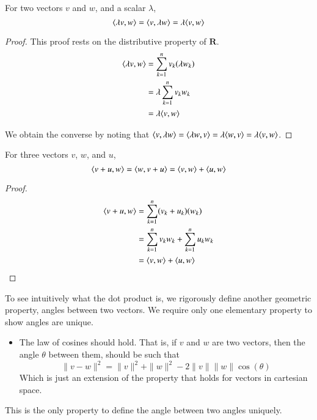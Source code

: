 \begin{lemma}
  For two vectors $v$ and $w$, and a scalar $\lambda$,
  \[ \langle\lambda v, w\rangle = \langle v, \lambda w\rangle = \lambda \langle v, w\rangle \]
\end{lemma}
\begin{proof}
  This proof rests on the distributive property of $\mathbf{R}$.
  \begin{align*}
    \langle\lambda v, w\rangle &= \sum_{k = 1}^n v_k (\lambda w_k)\\
                         &= \lambda \sum_{k = 1}^n v_k w_k\\
                         &= \lambda \langle v, w\rangle
  \end{align*}

  We obtain the converse by noting that $\langle v, \lambda w\rangle = \langle\lambda w, v\rangle = \lambda \langle w, v\rangle = \lambda \langle v, w\rangle$.
\end{proof}

\begin{lemma}
  For three vectors $v$, $w$, and $u$,
  \[ \langle v + u, w\rangle = \langle w, v + u\rangle = \langle v,w\rangle + \langle u,w\rangle  \]
\end{lemma}
\begin{proof}
  \begin{align*}
    \langle v + u, w\rangle &= \sum_{k = 1}^n (v_k + u_k)(w_k)\\
                     &= \sum_{k = 1}^n v_kw_k + \sum_{k = 1}^n u_kw_k\\
                     &= \langle v,w\rangle + \langle u,w\rangle
  \end{align*}
\end{proof}

To see intuitively what the dot product is, we rigorously define another geometric property, angles between two vectors. We require only one elementary property to show angles are unique.
%
\begin{itemize}
  \item The law of cosines should hold. That is, if $v$ and $w$ are two vectors, then the angle $\theta$ between them, should be such that
  \[ \|v - w\|^2 = \| v \|^2 + \| w \|^2 - 2\|v\|\|w\| \cos(\theta) \]
  Which is just an extension of the property that holds for vectors in cartesian space.
\end{itemize}
%
This is the only property to define the angle between two angles uniquely.

